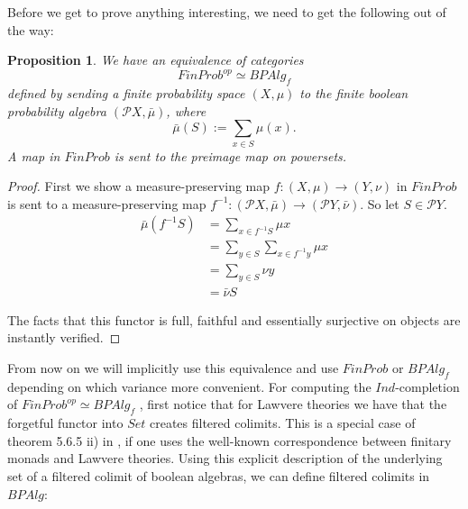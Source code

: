 \documentclass[a4paper]{amsproc}
\theoremstyle{plain}
\newtheorem{proposition}[theorem]{Proposition}
\theoremstyle{definition}
\theoremstyle{remark}
\numberwithin{equation}{section}
\begin{document}
Before we get to prove anything interesting, we need to get the following out of the way:

\begin{proposition} We have an equivalence of categories
\[
FinProb^{op} \simeq BPAlg_f
\]
defined by sending a finite probability space $(X, \mu)$ to the finite boolean probability algebra $(\mathcal{P} X, \bar{\mu})$, where
\[
\bar{\mu}(S) := \sum_{x \in S} \mu(x).
\]
A map in $FinProb$ is sent to the preimage map on powersets.
\end{proposition}
\begin{proof}
    First we show a measure-preserving map $f: (X,\mu) \to (Y,\nu)$ in $FinProb$ is sent to a measure-preserving map $f^{-1}: (\mathcal{P}X, \bar{\mu}) \to (\mathcal{P}Y, \bar{\nu})$. So let $S \in \mathcal{P} Y$.
    \begin{align*}
    \bar{\mu}(f^{-1} S) &= \sum_{x \in f^{-1} S} \mu x \\
    &= \sum_{y \in S} \sum_{x \in f^{-1} y} \mu x \\
    &= \sum_{y \in S} \nu y \\
    &= \bar{\nu} S
    \end{align*}

    The facts that this functor is full, faithful and essentially surjective on objects are instantly verified.
\end{proof}

From now on we will implicitly use this equivalence and use $FinProb$ or $BPAlg_f$ depending on which variance more convenient.
For computing the $Ind$-completion of $FinProb^{op} \simeq BPAlg_f$ , first notice that for Lawvere theories we have that the forgetful functor into $Set$ creates filtered colimits. This is a special case of theorem 5.6.5 ii) in \cite{riehl}, if one uses the well-known correspondence between finitary monads and Lawvere theories. Using this explicit description of the underlying set of a filtered colimit of boolean algebras, we can define filtered colimits in $BPAlg$:
\end{document}
